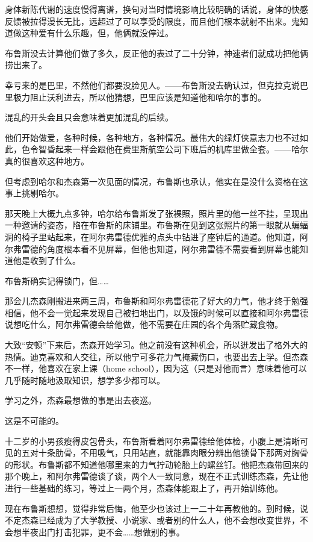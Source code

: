 \documentclass[../main]{subfiles}
\begin{document}
身体新陈代谢的速度慢得离谱，换句对当时情境影响比较明确的话说，身体的快感反馈被拉得漫长无比，远超过了可以享受的限度，而且他们根本就射不出来。鬼知道做这种爱有什么乐趣，但，他俩就没停过。

布鲁斯没去计算他们做了多久，反正他的表过了二十分钟，神速者们就成功把他俩捞出来了。

幸亏来的是巴里，不然他们都要没脸见人。——布鲁斯没去确认过，但克拉克说巴里极力阻止沃利进去，所以他猜想，巴里应该是知道他和哈尔的事的。

混乱的开头会且只会意味着更加混乱的后续。

他们开始做爱，各种时候，各种地方，各种情况。最伟大的绿灯侠意志力也不过如此，色令智昏起来一样会跟他在费里斯航空公司下班后的机库里做全套。——哈尔真的很喜欢这种地方。

但考虑到哈尔和杰森第一次见面的情况，布鲁斯也承认，他实在是没什么资格在这事上挑剔哈尔。

那天晚上大概九点多钟，哈尔给布鲁斯发了张裸照，照片里的他一丝不挂，呈现出一种邀请的姿态，陷在布鲁斯的床铺里。布鲁斯在见到这张照片的第一眼就从蝙蝠洞的椅子里站起来，在阿尔弗雷德优雅的点头中钻进了座钟后的通道。他知道，阿尔弗雷德的角度根本看不见屏幕，但他也知道，阿尔弗雷德不需要看到屏幕也能知道他是收到了什么。

布鲁斯确实记得锁门，但……

那会儿杰森刚搬进来两三周，布鲁斯和阿尔弗雷德花了好大的力气，他才终于勉强相信，他不会一觉起来发现自己被扫地出门，以及饿的时候可以直接和阿尔弗雷德说想吃什么，阿尔弗雷德会给他做，他不需要在庄园的各个角落贮藏食物。

大致“安顿”下来后，杰森开始学习。他之前没有这种机会，所以迸发出了格外大的热情。迪克喜欢和人交往，所以他宁可多花力气掩藏伤口，也要出去上学。但杰森不一样，他喜欢在家上课（home
school），因为这（只是对他而言）意味着他可以几乎随时随地汲取知识，想学多少都可以。

学习之外，杰森最想做的事是出去夜巡。

这是不可能的。

十二岁的小男孩瘦得皮包骨头，布鲁斯看着阿尔弗雷德给他体检，小腹上是清晰可见的五对十条肋骨，不用吸气，只用站直，就能靠肉眼分辨出他锁骨下那两对胸骨的形状。布鲁斯都不知道他哪里来的力气拧动轮胎上的螺丝钉。他把杰森带回来的那个晚上，和阿尔弗雷德谈了谈，两个人一致同意，现在不正式训练杰森，先让他进行一些基础的练习，等过上一两个月，杰森体能跟上了，再开始训练他。

现在布鲁斯想想，觉得非常后悔，他至少也该过上一二十年再教他的。到时候，说不定杰森已经成为了大学教授、小说家、或者别的什么人，他不会想改变世界，不会想半夜出门打击犯罪，更不会……想做别的事。
\end{document}
